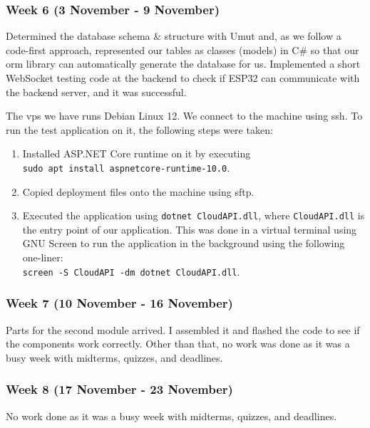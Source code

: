 \documentclass[12pt]{article}
\begin{document}
\subsubsection{Week 6 (3 November - 9 November)}
Determined the database schema \& structure with Umut and, as we follow a code-first approach, represented our tables as classes (models) in C\# so that our \gls{orm} library can automatically generate the database for us. Implemented a short WebSocket testing code at the backend to check if ESP32 can communicate with the backend server, and it was successful.\par
The \gls{vps} we have runs Debian Linux 12. We connect to the machine using \gls{ssh}. To run the test application on it, the following steps were taken:
\begin{enumerate}
    \item Installed ASP.NET Core runtime on it by executing\\\verb|sudo apt install aspnetcore-runtime-10.0|.
    \item Copied deployment files onto the machine using \gls{sftp}.
    \item Executed the application using \verb|dotnet CloudAPI.dll|, where \verb|CloudAPI.dll| is the entry point of our application. This was done in a virtual terminal using GNU Screen\supercite{gnu-screen} to run the application in the background using the following one-liner: \\\verb|screen -S CloudAPI -dm dotnet CloudAPI.dll|.
\end{enumerate}

\subsubsection{Week 7 (10 November - 16 November)}
Parts for the second module arrived. I assembled it and flashed the code to see if the components work correctly. Other than that, no work was done as it was a busy week with midterms, quizzes, and deadlines.

\subsubsection{Week 8 (17 November - 23 November)}
No work done as it was a busy week with midterms, quizzes, and deadlines.
\end{document}
